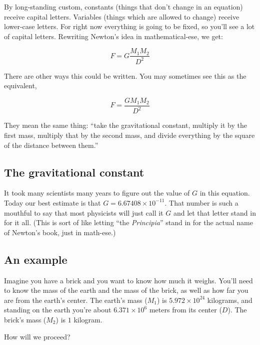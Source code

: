 \documentclass[10pt,letterpaper]{report}
\begin{document}
By long-standing custom, constants (things that don't change in an
equation) receive capital letters.  Variables (things which are
allowed to change) receive lower-case letters.  For right now
everything is going to be fixed, so you'll see a lot of capital
letters.  Rewriting Newton's idea in mathematical-ese, we get:

\[
F = G\frac{M_1 M_2}{D^2}
\]

There are other ways this could be written.  You may sometimes see
this as the equivalent,

\[
F = \frac{G M_1 M_2}{D^2}
\]

They mean the same thing: ``take the gravitational constant, multiply
it by the first mass, multiply that by the second mass, and divide
everything by the square of the distance between them.''

\subsection{The gravitational constant}
It took many scientists many years to figure out the value of $G$ in
this equation.  Today our best estimate is that $G = 6.67408 \times
10^{-11}$.  That number is such a mouthful to say that most physicists
will just call it $G$ and let that letter stand in for it all.  (This
is sort of like letting ``the \textit{Principia}'' stand in for the
actual name of Newton's book, just in math-ese.)

\subsection{An example}
Imagine you have a brick and you want to know how much it
weighs. You'll need to know the mass of the earth and the mass of the
brick, as well as how far you are from the earth's center.  The
earth's mass ($M_1$) is $5.972 \times 10^{24}$ kilograms, and standing
on the earth you're about $6.371 \times 10^6$ meters from its center
($D$).  The brick's mass ($M_2$) is $1$ kilogram.

How will we proceed?
\end{document}
